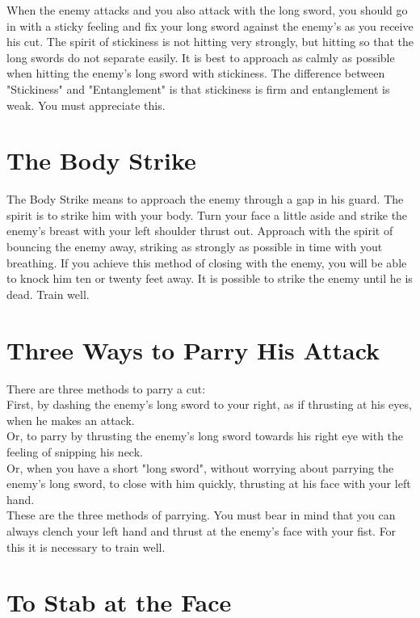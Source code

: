 When the enemy attacks and you also attack with the long sword, you should go in with a sticky feeling and fix your long sword against the enemy's as you receive his cut. The spirit of stickiness is not hitting very strongly, but hitting so that the long swords do not separate easily. It is best to approach as calmly as possible when hitting the enemy's long sword with stickiness. The difference between "Stickiness" and "Entanglement" is that stickiness is firm and entanglement is weak. You must appreciate this.\\
\section{The Body Strike}

The Body Strike means to approach the enemy through a gap in his guard. The spirit is to strike him with your body. Turn your face a little aside and strike the enemy's breast with your left shoulder thrust out. Approach with the spirit of bouncing the enemy away, striking as strongly as possible in time with yout breathing. If you achieve this method of closing with the enemy, you will be able to knock him ten or twenty feet away. It is possible to strike the enemy until he is dead. Train well.\\
\section{Three Ways to Parry His Attack}

There are three methods to parry a cut:\\

First, by dashing the enemy's long sword to your right, as if thrusting at his eyes, when he makes an attack.\\

Or, to parry by thrusting the enemy's long sword towards his right eye with the feeling of snipping his neck.\\

Or, when you have a short "long sword", without worrying about parrying the enemy's long sword, to close with him quickly, thrusting at his face with your left hand.\\

These are the three methods of parrying. You must bear in mind that you can always clench your left hand and thrust at the enemy's face with your fist. For this it is necessary to train well.\\
\section{To Stab at the Face}

